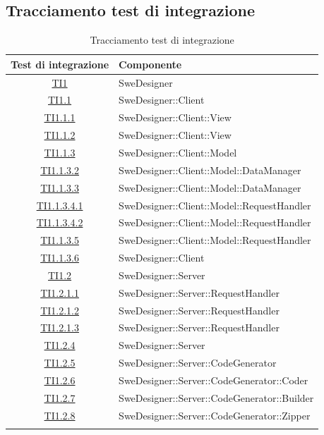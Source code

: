 \documentclass[../PianoDiQualifica.tex]{subfiles}
\begin{document}
	\subsection{Tracciamento test di integrazione}
	\normalsize
	\begin{longtable}{|c|l|}
		\hline
		\textbf{Test di integrazione} & \textbf{Componente}\\
		\hline
		\endhead
		\hyperlink{TI1}{TI1} & SweDesigner \\
		\hline
		\hyperlink{TI1.1}{TI1.1} & SweDesigner::Client \\
		\hline
		\hyperlink{TI1.1.1}{TI1.1.1} & SweDesigner::Client::View \\
		\hline
		\hyperlink{TI1.1.2}{TI1.1.2} & SweDesigner::Client::View \\
		\hline
		\hyperlink{TI1.1.3}{TI1.1.3} & SweDesigner::Client::Model \\
		\hline
		\hyperlink{TI1.1.3.2}{TI1.1.3.2} & SweDesigner::Client::Model::DataManager \\
		\hline
		\hyperlink{TI1.1.3.3}{TI1.1.3.3} & SweDesigner::Client::Model::DataManager \\
		\hline
		\hyperlink{TI1.1.3.4.1}{TI1.1.3.4.1} & SweDesigner::Client::Model::RequestHandler \\
		\hline
		\hyperlink{TI1.1.3.4.2}{TI1.1.3.4.2} & SweDesigner::Client::Model::RequestHandler \\
		\hline
		\hyperlink{TI1.1.3.5}{TI1.1.3.5} & SweDesigner::Client::Model::RequestHandler \\
		\hline
		\hyperlink{TI1.1.3.6}{TI1.1.3.6} & SweDesigner::Client \\
		\hline
		\hyperlink{TI1.2}{TI1.2} & SweDesigner::Server \\
		\hline
		\hyperlink{TI1.2.1.1}{TI1.2.1.1} & SweDesigner::Server::RequestHandler \\
		\hline
		\hyperlink{TI1.2.1.2}{TI1.2.1.2} & SweDesigner::Server::RequestHandler \\
		\hline
		\hyperlink{TI1.2.1.3}{TI1.2.1.3} & SweDesigner::Server::RequestHandler \\
		\hline
		\hyperlink{TI1.2.4}{TI1.2.4} & SweDesigner::Server \\
		\hline
		\hyperlink{TI1.2.5}{TI1.2.5} & SweDesigner::Server::CodeGenerator \\
		\hline
		\hyperlink{TI1.2.6}{TI1.2.6} & SweDesigner::Server::CodeGenerator::Coder \\
		\hline
		\hyperlink{TI1.2.7}{TI1.2.7} & SweDesigner::Server::CodeGenerator::Builder \\
		\hline
		\hyperlink{TI1.2.8}{TI1.2.8} & SweDesigner::Server::CodeGenerator::Zipper \\
		\hline
		\caption[Tracciamento test di integrazione]{Tracciamento test di integrazione}
		\label{tabella:TracciamentoTestIntegrazione}
		
	\end{longtable}
\end{document}
